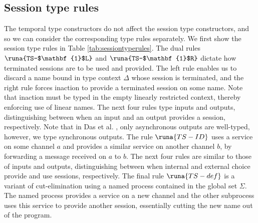 %
\subsection{Session type rules}
The temporal type constructors do not affect the session type constructors, and so we can consider the corresponding type rules separately. We first show the session type rules in Table \ref{tab:sessiontyperules}.  The dual rules $\runa{TS-$\mathbf{1}$L}$ and $\runa{TS-$\mathbf{1}$R}$ dictate how terminated sessions are to be used and provided. The left rule enables us to discard a name bound in type context $\Delta$ whose session is terminated, and the right rule forces inaction to provide a terminated session on some name. Note that inaction must be typed in the empty linearly restricted context, thereby enforcing use of linear names. The next four rules type inputs and outputs, distinguishing between when an input and an output provides a session, respectively. Note that in Das et al. \cite{DasEtAl2018}, only asynchronous outputs are well-typed, however, we type synchronous outputs. The rule $\runa{TS-ID}$ uses a service on some channel $a$ and provides a similar service on another channel $b$, by forwarding a message received on $a$ to $b$. The next four rules are similar to those of inputs and outputs, distinguishing between when internal and external choice provide and use sessions, respectively. The final rule $\runa{TS-def}$ is a variant of cut-elimination using a named process contained in the global set $\Sigma$. The named process provides a service on a new channel and the other subprocess uses this service to provide another session, essentially cutting the new name out of the program.


